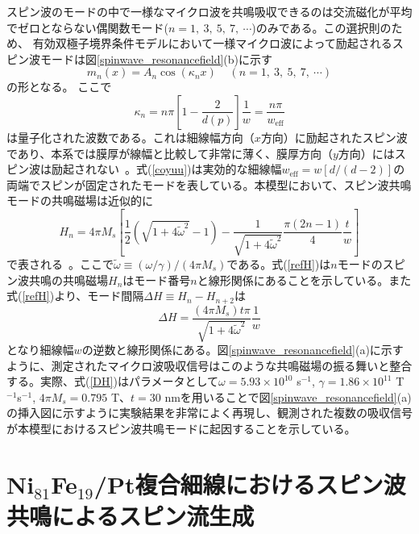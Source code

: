 スピン波のモードの中で一様なマイクロ波を共鳴吸収できるのは交流磁化が平均でゼロとならない偶関数モード($n=1,\: 3,\: 5,\: 7,\: \cdots$)のみである。この選択則のため、
有効双極子境界条件モデルにおいて一様マイクロ波によって励起されるスピン波モードは図\ref{spinwave_resonancefield}(b)に示す
\begin{equation}
m_n(x) = A_n \cos(\kappa _n x)\;\;\;\; (n=1,\: 3,\: 5,\: 7,\: \cdots)\label{coyuu}
\end{equation}
の形となる。
ここで
\begin{equation}
\kappa_n = n\pi\left[1-\frac{2}{d(p)}\right]\frac{1}{w}=\frac{n\pi}{w_\text{eff}}
\end{equation}
は量子化された波数である。これは細線幅方向（$x$方向）に励起されたスピン波であり、本系では膜厚が線幅と比較して非常に薄く、膜厚方向（$y$方向）にはスピン波は励起されない~\cite{Guslienko2}。式(\ref{coyuu})は実効的な細線幅$w_\text{eff}=w[d/(d-2)]$の両端でスピンが固定されたモードを表している。本模型において、スピン波共鳴モードの共鳴磁場は近似的に
\begin{equation}
{H_n} = 4\pi {M_s}\left[ {\frac{1}{2}\left( {\sqrt {1 + 4\tilde \omega ^2}  - 1} \right) - \frac{1}{{\sqrt {1 + 4\tilde \omega ^2} }}\frac{{\pi (2n - 1)}}{4}\frac{t}{w}} \right] \label{refH}
\end{equation}
で表される~\cite{Guslienko}。ここで$\tilde \omega \equiv(\omega/\gamma)/(4\pi M_s)$である。式(\ref{refH})は$n$モードのスピン波共鳴の共鳴磁場$H_n$はモード番号$n$と線形関係にあることを示している。また式(\ref{refH})より、モード間隔$\Delta H\equiv H_n-H_{n+2}$は
\begin{equation}
\Delta H=\frac{(4\pi M_s)t \pi}{\sqrt {1 + 4\tilde \omega ^2}}\frac{1}{w}\label{DH}
\end{equation}
となり細線幅$w$の逆数と線形関係にある。図\ref{spinwave_resonancefield}(a)に示すように、測定されたマイクロ波吸収信号はこのような共鳴磁場の振る舞いと整合する。実際、式(\ref{DH})はパラメータとして$\omega=5.93\times10^{10}$ s$^{-1}$, $\gamma=1.86\times 10^{11}$ T$^{-1}$s$^{-1}$, $4\pi M_s=0.795$ T、$t=30$ nmを用いることで図\ref{spinwave_resonancefield}(a)の挿入図に示すように実験結果を非常によく再現し、観測された複数の吸収信号が本模型におけるスピン波共鳴モードに起因することを示している。








\section{Ni$_{81}$Fe$_{19}$/Pt複合細線におけるスピン波共鳴によるスピン流生成}
